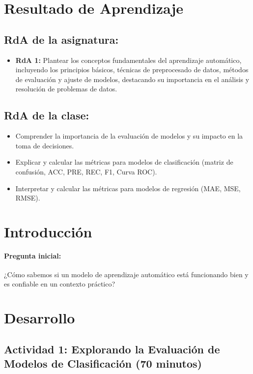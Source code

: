 \documentclass[a4,11pt]{aleph-notas}
\begin{document}
\encabezado


\section*{Resultado de Aprendizaje}

\subsection*{RdA de la asignatura:}
\begin{itemize}[leftmargin=*]
    \item \textbf{RdA 1:} 
    Plantear los conceptos fundamentales del aprendizaje automático, incluyendo los principios básicos, técnicas de preprocesado de datos, métodos de evaluación y ajuste de modelos, destacando su importancia en el análisis y resolución de problemas de datos.
\end{itemize}

\subsection*{RdA de la clase:}
    \begin{itemize}[leftmargin=*]
        \item Comprender la importancia de la evaluación de modelos y su impacto en la toma de decisiones.
        \item Explicar y calcular las métricas para modelos de clasificación (matriz de confusión, ACC, PRE, REC, F1, Curva ROC).
        \item Interpretar y calcular las métricas para modelos de regresión (MAE, MSE, RMSE).
    \end{itemize}

\section*{Introducción}

\paragraph{Pregunta inicial:} 
¿Cómo sabemos si un modelo de aprendizaje automático está funcionando bien y es confiable en un contexto práctico?


\section*{Desarrollo}

\subsection*{Actividad 1: Explorando la Evaluación de Modelos de Clasificación (70 minutos)}
\end{document}
